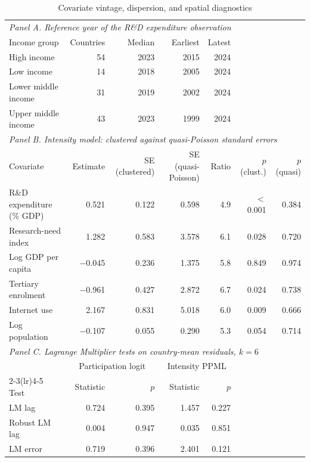 \documentclass[ASNA,twocolumn]{USG}
\begin{document}
\begin{table}[!t]
\centering
\footnotesize
\caption{Covariate vintage, dispersion, and spatial diagnostics}
\label{tab:diagnostics}
\begin{tabular*}{\textwidth}{@{\extracolsep\fill}l r r r r r r@{}}
\toprule
\multicolumn{7}{l}{\textit{Panel A. Reference year of the R\&D expenditure observation}} \\
Income group & Countries & Median & Earliest & Latest & \multicolumn{2}{c}{} \\
\midrule
High income & 54 & 2023 & 2015 & 2024 & \multicolumn{2}{c}{} \\
Low income & 14 & 2018 & 2005 & 2024 & \multicolumn{2}{c}{} \\
Lower middle income & 31 & 2019 & 2002 & 2024 & \multicolumn{2}{c}{} \\
Upper middle income & 43 & 2023 & 1999 & 2024 & \multicolumn{2}{c}{} \\
\midrule
\multicolumn{7}{l}{\textit{Panel B. Intensity model: clustered against quasi-Poisson standard errors}} \\
Covariate & Estimate & SE (clustered) & SE (quasi-Poisson) & Ratio & $p$ (clust.) & $p$ (quasi) \\
\midrule
R\&D expenditure (\% GDP) & 0.521 & 0.122 & 0.598 & 4.9 & $<$0.001 & 0.384 \\
Research-need index & 1.282 & 0.583 & 3.578 & 6.1 & 0.028 & 0.720 \\
Log GDP per capita & $-$0.045 & 0.236 & 1.375 & 5.8 & 0.849 & 0.974 \\
Tertiary enrolment & $-$0.961 & 0.427 & 2.872 & 6.7 & 0.024 & 0.738 \\
Internet use & 2.167 & 0.831 & 5.018 & 6.0 & 0.009 & 0.666 \\
Log population & $-$0.107 & 0.055 & 0.290 & 5.3 & 0.054 & 0.714 \\
\midrule
\multicolumn{7}{l}{\textit{Panel C. Lagrange Multiplier tests on country-mean residuals, $k=6$}} \\
& \multicolumn{2}{c}{Participation logit} & \multicolumn{2}{c}{Intensity PPML} & \multicolumn{2}{c}{} \\
\cmidrule(lr){2-3}\cmidrule(lr){4-5}
Test & Statistic & $p$ & Statistic & $p$ & \multicolumn{2}{c}{} \\
\midrule
LM lag & 0.724 & 0.395 & 1.457 & 0.227 & \\
Robust LM lag & 0.004 & 0.947 & 0.035 & 0.851 & \\
LM error & 0.719 & 0.396 & 2.401 & 0.121 & \\

\end{tabular*}
\end{table}
\end{document}
